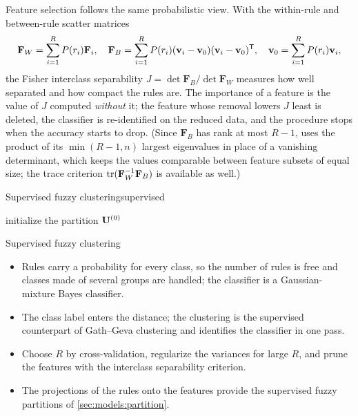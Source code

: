 Feature selection follows the same probabilistic view. With the within-rule and between-rule scatter matrices
\begin{equation}
  \mathbf{F}_W=\sum_{i=1}^{R}P(r_i)\mathbf{F}_i,\quad
  \mathbf{F}_B=\sum_{i=1}^{R}P(r_i)(\mathbf{v}_i-\mathbf{v}_0)(\mathbf{v}_i-\mathbf{v}_0)^{\mathsf{T}},\quad
  \mathbf{v}_0=\sum_{i=1}^{R}P(r_i)\mathbf{v}_i,
  \label{eq:models:scatter}
\end{equation}
the Fisher interclass separability $J=\det\mathbf{F}_B/\det\mathbf{F}_W$ measures how well separated and how compact the rules are. The importance of a feature is the value of $J$ computed \emph{without} it; the feature whose removal lowers $J$ least is deleted, the classifier is re-identified on the reduced data, and the procedure stops when the accuracy starts to drop. (Since $\mathbf{F}_B$ has rank at most $R-1$,  uses the product of its $\min(R-1,n)$ largest eigenvalues in place of a vanishing determinant, which keeps the values comparable between feature subsets of equal size; the trace criterion $\operatorname{tr}(\mathbf{F}_W^{-1}\mathbf{F}_B)$ is available as well.)

\begin{algobox}{Supervised fuzzy clustering}{supervised}
\begin{algorithm}[H]
initialize the partition $\mathbf{U}^{(0)}$\;
\end{algorithm}
\end{algobox}
\begin{summarybox}{Supervised fuzzy clustering}
\begin{itemize}
  \item Rules carry a probability for every class, so the number of rules is free and classes made of several groups are handled; the classifier is a Gaussian-mixture Bayes classifier.
  \item The class label enters the distance; the clustering is the supervised counterpart of Gath--Geva clustering and identifies the classifier in one pass.
  \item Choose $R$ by cross-validation, regularize the variances for large $R$, and prune the features with the interclass separability criterion.
  \item The projections of the rules onto the features provide the supervised fuzzy partitions of \cref{sec:models:partition}.
\end{itemize}
\end{summarybox}

